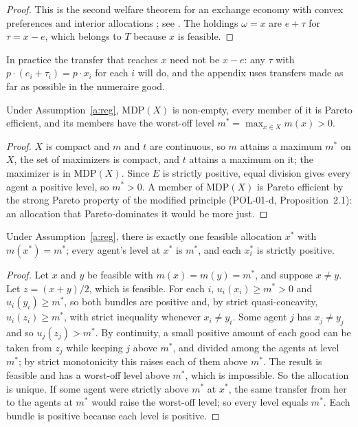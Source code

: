 \documentclass{situationist-preprint}
\begin{document}
\begin{proof}
This is the second welfare theorem for an exchange economy with convex preferences and interior allocations \citep{Arrow1951,Debreu1959}; see \citet[ch.~16]{MasColell1995}. The holdings $\omega = x$ are $e + \tau$ for $\tau = x - e$, which belongs to $T$ because $x$ is feasible.
\end{proof}

In practice the transfer that reaches $x$ need not be $x - e$: any $\tau$ with $p \cdot (e_i + \tau_i) = p \cdot x_i$ for each $i$ will do, and the appendix uses transfers made as far as possible in the numeraire good.

\begin{lemma}\label{l:mdpx}
Under Assumption~\ref{a:reg}, $\mathrm{MDP}(X)$ is non-empty, every member of it is Pareto efficient, and its members have the worst-off level $m^* = \max_{x \in X} m(x) > 0$.
\end{lemma}

\begin{proof}
$X$ is compact and $m$ and $t$ are continuous, so $m$ attains a maximum $m^*$ on $X$, the set of maximizers is compact, and $t$ attains a maximum on it; the maximizer is in $\mathrm{MDP}(X)$. Since $E$ is strictly positive, equal division gives every agent a positive level, so $m^* > 0$. A member of $\mathrm{MDP}(X)$ is Pareto efficient by the strong Pareto property of the modified principle (POL-01-d, Proposition~2.1): an allocation that Pareto-dominates it would be more just.
\end{proof}

\begin{proposition}\label{p:unique}
Under Assumption~\ref{a:reg}, there is exactly one feasible allocation $x^*$ with $m(x^*) = m^*$; every agent's level at $x^*$ is $m^*$, and each $x^*_i$ is strictly positive.
\end{proposition}

\begin{proof}
Let $x$ and $y$ be feasible with $m(x) = m(y) = m^*$, and suppose $x \neq y$. Let $z = (x + y)/2$, which is feasible. For each $i$, $u_i(x_i) \geq m^* > 0$ and $u_i(y_i) \geq m^*$, so both bundles are positive and, by strict quasi-concavity, $u_i(z_i) \geq m^*$, with strict inequality whenever $x_i \neq y_i$. Some agent $j$ has $x_j \neq y_j$ and so $u_j(z_j) > m^*$. By continuity, a small positive amount of each good can be taken from $z_j$ while keeping $j$ above $m^*$, and divided among the agents at level $m^*$; by strict monotonicity this raises each of them above $m^*$. The result is feasible and has a worst-off level above $m^*$, which is impossible. So the allocation is unique. If some agent were strictly above $m^*$ at $x^*$, the same transfer from her to the agents at $m^*$ would raise the worst-off level; so every level equals $m^*$. Each bundle is positive because each level is positive.
\end{proof}
\end{document}
